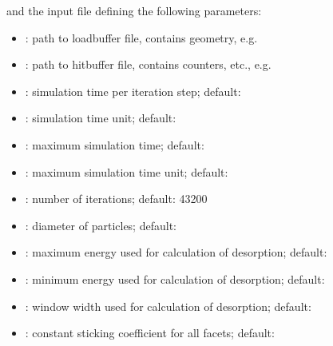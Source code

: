 and the input file defining the following parameters:
\begin{itemize}[noitemsep,topsep=0pt, partopsep=0pt]
\item {}: path to loadbuffer file, contains geometry, e.g.\ 
\item {}: path to hitbuffer file, contains counters, etc., e.g.\ 
\item {}: simulation time per iteration step; default: 
\item {}: simulation time unit; default: 
\item {}: maximum simulation time; default: 
\item {}: maximum simulation time unit; default: 
\item {}: number of iterations; default: 43200
\item {}: diameter of particles; default:
\item {}: maximum energy used for calculation of desorption; default:
\item {}: minimum energy used for calculation of desorption; default:
\item {}: window width used for calculation of desorption; default:
\item {}: constant sticking coefficient for all facets; default:

\end{itemize}
